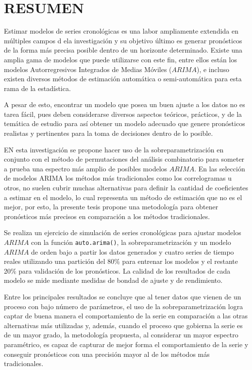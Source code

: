 \documentclass[
]{article}
\begin{document}
\cleardoublepage

\tableofcontents
\listoftables
\listoffigures

\cleardoublepage
{}

\newpage

\section*{RESUMEN}

Estimar modelos de series cronológicas es una labor ampliamente
extendida en múltiples campos d ela investigación y su objetivo último
es generar pronósticos de la forma más precisa posible dentro de un
horizonte determinado. Existe una amplia gama de modelos que puede
utilizarse con este fin, entre ellos están los modelos Autorregresivos
Integrados de Medias Móviles (\(ARIMA\)), e incluso existen diversos
métodos de estimación automática o semi-automática para esta rama de la
estadística.

A pesar de esto, encontrar un modelo que posea un buen ajuste a los
datos no es tarea fácil, pues deben considerarse diversos aspectos
teóricos, prácticos, y de la temática de estudio para así obtener un
modelo adecuado que genere pronósticos realistas y pertinentes para la
toma de decisiones dentro de lo posible.

EN esta investigación se propone hacer uso de la sobreparametrización en
conjunto con el método de permutaciones del análisis combinatorio para
someter a prueba una espectro más amplio de posibles modelos \(ARIMA\).
En las selección de modelos ARIMA los métodos más tradicionales como los
correlogramas u otros, no suelen cubrir muchas alternativas para definir
la cantidad de coeficientes a estimar en el modelo, lo cual representa
un método de estimación que no es el mejor, por esto, la presente tesis
propone una metodología para obtener pronósticos más precisos en
comparación a los métodos tradicionales.

Se realiza un ejercicio de simulación de series cronológicas para
ajustar modelos \(ARIMA\) con la función \texttt{auto.arima()}, la
sobreparametrización y un modelo \(ARIMA\) de orden bajo a partir los
datos generados y cuatro series de tiempo reales utilizando una
partición del 80\% para entrenar los modelos y el restante 20\% para
validación de los pronósticos. La calidad de los resultados de cada
modelo se mide mediante medidas de bondad de ajuste y de rendimiento.

Entre los principales resultados se concluye que al tener datos que
vienen de un proceso con bajo número de parámetros, el uso de la
sobreparametrización logra captar de buena manera el comportamiento de
la serie en comparación a las otras alternativas más utilizadas y,
además, cuando el proceso que gobierna la serie es de un mayor grado, la
metodología propuesta, al considerar un mayor espectro paramétrico, es
capaz de capturar de mejor forma el comportamiento de la serie y
conseguir pronósticos con una precisión mayor al de los métodos más
tradicionales.
\end{document}
